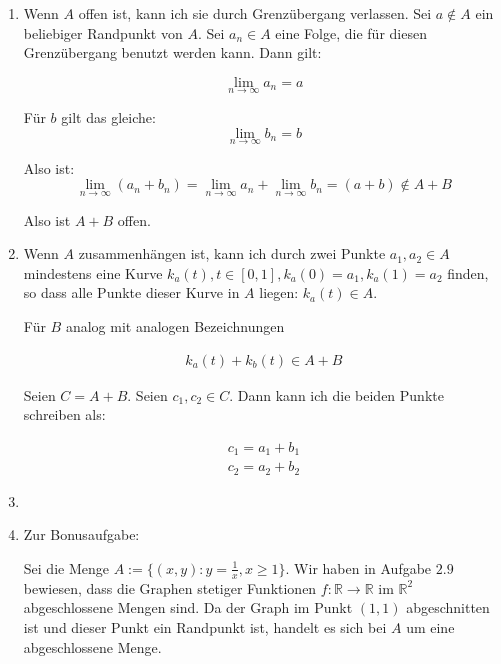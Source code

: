 \documentclass[a4paper,german,12pt,smallheadings]{scrartcl}
\begin{document}
\begin{enumerate}[(1)]
  \item
    Wenn $A$ offen ist, kann ich sie durch Grenzübergang verlassen. Sei $a
    \notin A$ ein beliebiger Randpunkt von $A$. Sei $a_n \in A$ eine Folge, die
    für diesen Grenzübergang benutzt werden kann. Dann gilt:

    \begin{equation*}
      \lim_{n \to \infty} a_n = a
    \end{equation*}

    Für $b$ gilt das gleiche:
    \begin{equation*}
      \lim_{n \to \infty} b_n = b
    \end{equation*}

    Also ist:
    \begin{equation*}
      \lim_{n \to \infty} (a_n + b_n) = \lim_{n \to \infty} a_n + \lim_{n \to \infty} b_n = (a + b) \notin A + B
    \end{equation*}

    Also ist $A+B$ offen.
  \item
    Wenn $A$ zusammenhängen ist, kann ich durch zwei Punkte $a_1, a_2 \in A$
    mindestens eine Kurve $k_a(t), t \in [0,1], k_a(0) = a_1, k_a(1) = a_2$
    finden, so dass alle Punkte dieser Kurve in $A$ liegen: $k_a(t) \in A$.

    Für $B$ analog mit analogen Bezeichnungen

    \begin{align*}
      k_a(t) + k_b(t) \in A+B
    \end{align*}

    Seien $C = A+B$. Seien $c_1, c_2 \in C$. Dann kann ich die beiden Punkte schreiben als:

    \begin{align*}
      c_1 = a_1 + b_1 \\
      c_2 = a_2 + b_2
    \end{align*}
  \item

  \item
    Zur Bonusaufgabe:

    Sei die Menge $A := \{(x,y): y = \frac{1}{x}, x \ge 1\}$. Wir
    haben in Aufgabe $2.9$ bewiesen, dass die Graphen stetiger Funktionen $f:
    \mathbb{R} \to \mathbb{R}$ im $\mathbb{R}^2$ abgeschlossene Mengen sind. Da der
    Graph im Punkt $(1,1)$ abgeschnitten ist und dieser Punkt ein Randpunkt ist,
    handelt es sich bei $A$ um eine abgeschlossene Menge.


\end{enumerate}
\end{document}
